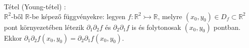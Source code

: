 \documentclass[12pt,a4paper]{scrartcl}
\newenvironment{tetel}{}{}
\newenvironment{bizonyitas}{}{}
\begin{document}
\begin{tetel}

Tétel (Young-tétel) :\\
\({\mathbb{R}}^{2}\)-ből \(\mathbb{R}\)-be képező függvényekre: legyen
\(\left. f:{\mathbb{R}}^{2}\rightarrowtail{\mathbb{R}} \right.\), melyre
\(\left( {x_{0},y_{0}} \right) \in D_{f} \subset {\mathbb{R}}^{2}\) pont
környezetében létezik \(\partial_{1}\partial_{2}f\) és
\(\partial_{2}\partial_{1}f\) is és folytonosak
\(\left( {x_{0},y_{0}} \right)\) pontban. Ekkor
\(\partial_{1}\partial_{2}f\left( {x_{0},y_{0}} \right) = \partial_{2}\partial_{1}f\left( {x_{0},y_{0}} \right)\).

\end{tetel}

\begin{bizonyitas}


\end{bizonyitas}
\end{document}

